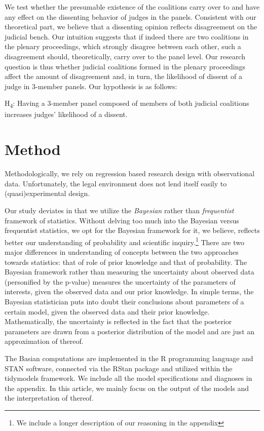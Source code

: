 \documentclass[
  11pt,
]{article}
\begin{document}
We test whether the presumable existence of the coalitions carry over to
and have any effect on the dissenting behavior of judges in the panels.
Consistent with our theoretical part, we believe that a dissenting
opinion reflects disagreement on the judicial bench. Our intuition
suggests that if indeed there are two coalitions in the plenary
proceedings, which strongly disagree between each other, such a
disagreement should, theoretically, carry over to the panel level. Our
research question is thus whether judicial coalitions formed in the
plenary proceedings affect the amount of disagreement and, in turn, the
likelihood of dissent of a judge in 3-member panels. Our hypothesis is
as follows:

H\textsubscript{4}: Having a 3-member panel composed of members of both
judicial coalitions increases judges' likelihood of a dissent.

\hypertarget{method}{%
\section{Method}\label{method}}

Methodologically, we rely on regression based research design with
observational data. Unfortunately, the legal environment does not lend
itself easily to (quasi)experimental design.

Our study deviates in that we utilize the \emph{Bayesian} rather than
\emph{frequentist} framework of statistics. Without delving too much
into the Bayesian versus frequentist statistics, we opt for the Bayesian
framework for it, we believe, reflects better our understanding of
probability and scientific inquiry.\footnote{We include a longer
  description of our reasoning in the appendix} There are two major
differences in understanding of concepts between the two approaches
towards statistics: that of role of prior knowledge and that of
probability. The Bayesian framework rather than measuring the
uncertainty about observed data (personified by the p-value) measures
the uncertainty of the parameters of interests, given the observed data
and our prior knowledge. In simple terms, the Bayesian statistician puts
into doubt their conclusions about parameters of a certain model, given
the observed data and their prior knowledge. Mathematically, the
uncertainty is reflected in the fact that the posterior parameters are
drawn from a posterior distribution of the model and are just an
approximation of thereof.

The Basian computations are implemented in the R programming language
and STAN software, connected via the RStan package and utilized within
the tidymodels framework. We include all the model specifications and
diagnoses in the appendix. In this article, we mainly focus on the
output of the models and the interpretation of thereof.
\end{document}
